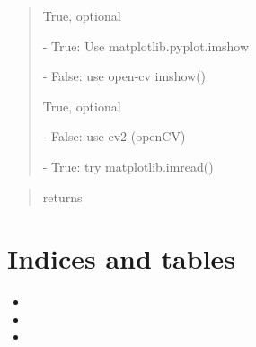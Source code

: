 \documentclass[letterpaper,10pt,english]{sphinxmanual}
\begin{document}
\begin{fulllineitems}
\begin{description}
\begin{quote}
\begin{description}
\item[{use\_plt\_show}] \leavevmode
\begin{DUlineblock}{0em}
\item[] True, optional
\item[]
\begin{DUlineblock}{\DUlineblockindent}
\item[] - True: Use matplotlib.pyplot.imshow 
\item[] - False: use open-cv imshow() 
\end{DUlineblock}
\end{DUlineblock}

\item[{use\_plt\_read}] \leavevmode
\begin{DUlineblock}{0em}
\item[] True, optional
\item[]
\begin{DUlineblock}{\DUlineblockindent}
\item[] - False: use cv2 (openCV)
\item[] - True: try matplotlib.imread()
\end{DUlineblock}
\end{DUlineblock}

\end{description}\end{quote}

\item[{Returns:}] \leavevmode\begin{quote}\begin{description}
\item[{returns}] \leavevmode
{}

\end{description}\end{quote}

\end{description}

\end{fulllineitems}



\chapter{Indices and tables}
\label{\detokenize{index:indices-and-tables}}\begin{itemize}
\item {} 

\item {} 

\item {} 

\end{itemize}
\end{document}
